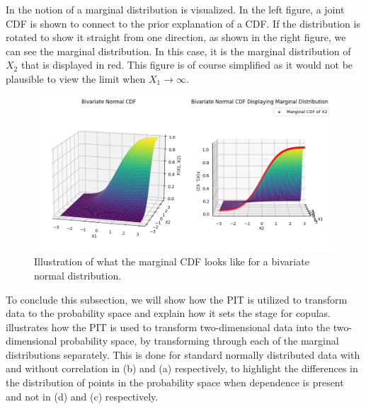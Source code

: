 In  the notion of a marginal distribution is visualized. In the left figure, a joint \gls{CDF} is shown to connect to the prior explanation of a \gls{CDF}. If the distribution is rotated to show it straight from one direction, as shown in the right figure, we can see the marginal distribution. In this case, it is the marginal distribution of $X_2$ that is displayed in red. This figure is of course simplified as it would not be plausible to view the limit when $X_1 \to \infty$.

\begin{figure}
    \centering
    \includegraphics[width=1\linewidth]{3Theory/pictures/MarginalIllustrated.png}
    \caption{Illustration of what the marginal \gls{CDF} looks like for a bivariate normal distribution.   }
    \label{fig:MarginalCDF}
\end{figure}

To conclude this subsection, we will show how the \gls{PIT} is utilized to transform data to the probability space and explain how it sets the stage for copulas.  illustrates how the \gls{PIT} is used to transform two-dimensional data into the two-dimensional probability space, by transforming through each of the marginal distributions separately. This is done for standard normally distributed data with and without correlation in (b) and (a) respectively, to highlight the differences in the distribution of points in the probability space when dependence is present and not in (d) and (c) respectively.

